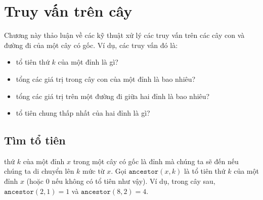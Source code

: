 \chapter{Truy vấn trên cây}


Chương này thảo luận về các kỹ thuật xử lý
các truy vấn trên các cây con và đường đi của một cây có gốc.
Ví dụ, các truy vấn đó là:

\begin{itemize}
\item tổ tiên thứ $k$ của một đỉnh là gì?
\item tổng các giá trị trong cây con của một đỉnh là bao nhiêu?
\item tổng các giá trị trên một đường đi giữa hai đỉnh là bao nhiêu?
\item tổ tiên chung thấp nhất của hai đỉnh là gì?
\end{itemize}

\section{Tìm tổ tiên}


 thứ $k$ của một đỉnh $x$ trong một cây có gốc
là đỉnh mà chúng ta sẽ đến nếu chúng ta di chuyển lên $k$
mức từ $x$.
Gọi $\texttt{ancestor}(x,k)$ là tổ tiên thứ $k$ của một đỉnh $x$
(hoặc $0$ nếu không có tổ tiên như vậy).
Ví dụ, trong cây sau,
$\texttt{ancestor}(2,1)=1$ và $\texttt{ancestor}(8,2)=4$.
\begin{center}
\end{center}

